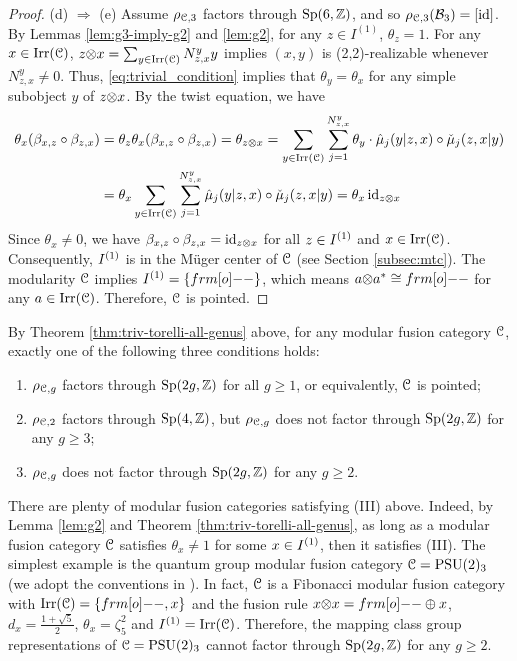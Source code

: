 \documentclass[11pt]{article}
\begin{document}
\begin{proof}
(d) $\Rightarrow$ (e) Assume  $\rho_{{\mathcal{C}}, {3}}$ factors through ${\operatorname{Sp}}(6, {\mathbb{Z}})$, and so $\RTrep{\cC}{3}(\db_3) = [\id]$. By Lemmas \ref{lem:g3-imply-g2} and \ref{lem:g2}, for any $z \in I^{(1)}$, $\theta_{z}=1$. For any $x \in {\operatorname{Irr}}({\mathcal{C}})$,  $z{\otimes} x = \sum_{y \in {\operatorname{Irr}}(\mathcal{C})} N_{z,x}^y y$  implies $(x,y)$ is (2,2)-realizable whenever $N_{z,x}^y \ne 0$. Thus, \eqref{eq:trivial_condition} implies that $\theta_y = \theta_x$ for any simple subobject $y$ of $z{\otimes} x$. By the twist equation, we have 
\begin{align*}
\theta_{x}({\beta}_{x, z}\circ {\beta}_{z,x}) & = \theta_{z}\theta_{x}({\beta}_{x,z}\circ{\beta}_{z,x}) = \theta_{z {\otimes} x} = 
\sum_{y \in {\operatorname{Irr}}(\mathcal{C})} \sum_{j =1}^{N_{z, x}^{y}} \theta_{y} \cdot \hat{\mu}_{j}(y |z, x) \circ \check{\mu}_{j}(z, x|y)\\
&= \theta_{x} \sum_{y \in {\operatorname{Irr}}(\mathcal{C})} \sum_{j =1}^{N_{z, x}^{y}}  \hat{\mu}_{j}(y |z, x) \circ \check{\mu}_{j}(z, x|y) = \theta_x \,{\operatorname{id}}_{z \otimes x}
\end{align*}
Since $\theta_x \ne 0$, we have ${\beta}_{x, z}\circ{\beta}_{z,x} = {\operatorname{id}}_{z {\otimes} x}$ for all $z \in I^{(1)}$ and $x \in {\operatorname{Irr}}(\mathcal{C})$. Consequently, $I^{(1)}$ is in the M\"uger center of $\mathcal{C}$ (see Section \ref{subsec:mtc}). The modularity $\mathcal{C}$ implies $\AdSet{1} = \{\1\}$,  which means  $a \ot a^* \cong \1$ for any $a \in {\operatorname{Irr}}(\mathcal{C})$. Therefore, $\mathcal{C}$ is pointed.
\end{proof}

By Theorem \ref{thm:triv-torelli-all-genus} above, for any modular fusion category $\mathcal{C}$,  exactly one of the following three conditions holds:

\begin{enumerate}[label=(\Roman*)]
\item $\rho_{{\mathcal{C}}, {g}}$ factors through ${\operatorname{Sp}}(2g, {\mathbb{Z}})$ for all $g \ge 1$, or equivalently, $\mathcal{C}$ is pointed;
\item $\rho_{{\mathcal{C}}, {2}}$ factors through ${\operatorname{Sp}}(4, {\mathbb{Z}})$, but $\rho_{{\mathcal{C}}, {g}}$ does not factor through ${\operatorname{Sp}}(2g, {\mathbb{Z}})$ for any $g \ge 3$;
\item $\rho_{{\mathcal{C}}, {g}}$ does not factor through ${\operatorname{Sp}}(2g, {\mathbb{Z}})$ for any $g \ge 2$.
\end{enumerate}

There are plenty of modular fusion categories satisfying (III) above. Indeed, by Lemma \ref{lem:g2} and Theorem \ref{thm:triv-torelli-all-genus}, as long as a modular fusion category $\mathcal{C}$ satisfies $\theta_{x} \ne 1$ for some $x \in I^{(1)}$, then it satisfies (III). The simplest example  is  the quantum group modular fusion category $\mathcal{C} = {\operatorname{PSU}}(2)_{3}$ (we adopt the conventions in \cite{NWZ-trans}). In fact, $\mathcal{C}$ is a Fibonacci modular fusion category with $\irr(\cC)=\{\1, x\}$ and the fusion rule $x \ot x = \1 \oplus x$, $d_x = \frac{1+\sqrt{5}}{2}$, $\theta_{x} = \zeta_5^2$ and $I^{(1)} = {\operatorname{Irr}}(\mathcal{C})$. Therefore, the mapping class group representations of $\mathcal{C} = {\operatorname{PSU}}(2)_{3}$ cannot factor through ${\operatorname{Sp}}(2g, {\mathbb{Z}})$ for any $g \ge 2$.
\end{document}
